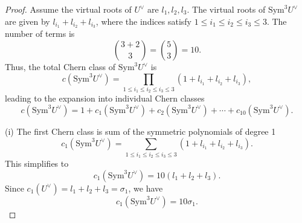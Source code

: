 \documentclass{article}
\theoremstyle{definition}
\begin{document}
\begin{proof}
Assume the virtual roots of \(U^\vee\) are \(l_1, l_2, l_3\). The virtual roots of \(\mathrm{Sym}^3 U^\vee\) are given by \(l_{i_1} + l_{i_2} + l_{i_3}\), where the indices satisfy \(1 \leq i_1 \leq i_2 \leq i_3 \leq 3\).
The number of terms is
\[
\binom{3+2}{3} = \binom{5}{3} = 10.
\]
Thus, the total Chern class of \(\mathrm{Sym}^3 U^\vee\) is
\[
c(\mathrm{Sym}^3 U^\vee) = \prod_{1 \leq i_1 \leq i_2 \leq i_3 \leq 3} (1 + l_{i_1} + l_{i_2} + l_{i_3}),
\]
leading to the expansion into individual Chern classes
\[
c(\mathrm{Sym}^3 U^\vee) = 1 + c_1(\mathrm{Sym}^3 U^\vee) + c_2(\mathrm{Sym}^3 U^\vee) + \cdots + c_{10}(\mathrm{Sym}^3 U^\vee).
\]



(i) The first Chern class is sum of the symmetric polynomials of degree 1
\[
c_1(\mathrm{Sym}^3 U^\vee) = \sum_{1 \leq i_1 \leq i_2 \leq i_3 \leq 3} (1 + l_{i_1} + l_{i_2} + l_{i_3}).
\]
This simplifies to
\[
c_1(\mathrm{Sym}^3 U^\vee) = 10 (l_1 + l_2 + l_3).
\]
Since \(c_1(U^\vee) = l_1 + l_2 + l_3 = \sigma_1\), we have
\[
c_1(\mathrm{Sym}^3 U^\vee) = 10 \sigma_1.
\]




\end{proof}
\end{document}
